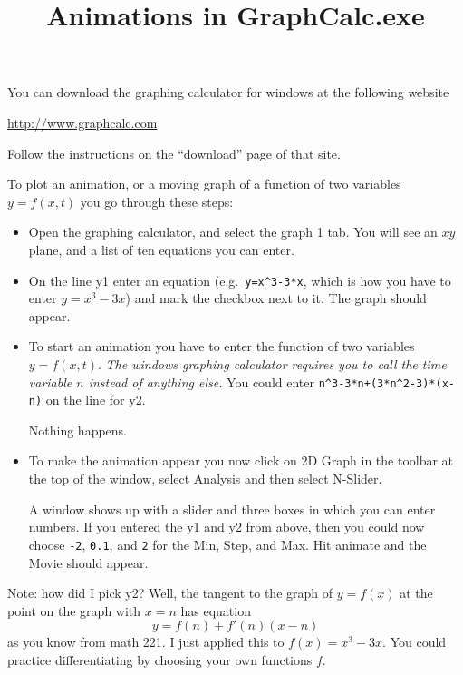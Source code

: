 \documentclass[12pt]{amsart}
\begin{document}
\title{Animations in GraphCalc.exe}
\maketitle

You can download the graphing calculator for windows at the following website
\begin{center}
  \url{http://www.graphcalc.com}
\end{center}
Follow the instructions on the ``download'' page of that site.

To plot an animation, or a moving graph of a function of two variables
$y=f(x, t)$ you go through these steps:
\begin{itemize}
\item Open the graphing calculator, and select the \textsf{graph 1} tab.
  You will see an $xy$ plane, and a list of ten equations you can enter.

\item On the line \textsf{y1} enter an equation (e.g.\ \verb|y=x^3-3*x|,
  which is how you have to enter $y=x^3-3x$) and mark the checkbox next to
  it.  The graph should appear.

\item To start an animation you have to enter the function of two variables
  $y=f(x, t)$. \emph{ The windows graphing calculator requires you to call the
  time variable $n$ instead of anything else.}  You could enter
  \verb|n^3-3*n+(3*n^2-3)*(x-n)| on the line for \textsf{y2}.

  Nothing happens.


\item To make the animation appear you now click on \textsf{2D Graph} in
  the toolbar at the top of the window, select \textsf{Analysis} and then
  select \textsf{N-Slider}.

  A window shows up with a slider and three boxes in which you can enter
  numbers.  If you entered the \textsf{y1} and \textsf{y2} from above, then
  you could now choose \verb|-2|, \verb|0.1|, and \verb|2| for the
  \textsf{Min}, \textsf{Step}, and \textsf{Max}.  Hit \textsf{animate} and
  the Movie should appear.
\end{itemize}

Note: how did I pick \textsf{y2}? Well, the tangent to the graph of
$y=f(x)$ at the point on the graph with $x=n$ has equation
\[
y = f(n) + f'(n) (x-n)
\]
as you know from math 221.  I just applied this to $f(x) = x^3-3x$.  You
could practice differentiating by choosing your own functions $f$.
\end{document}

